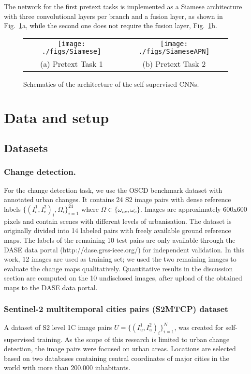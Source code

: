 \documentclass[runningheads]{llncs}
\begin{document}
{The network for the first pretext tasks is implemented as a Siamese architecture with three convolutional layers per branch and a fusion layer, as shown in Fig.~\ref{fig:siamese}a, while the second one does not require the fusion layer, Fig.~\ref{fig:siamese}b.}

\begin{figure}
    \centering
\begin{tabular}{cc}
    \texttt{[image: ./figs/Siamese]} &
    \texttt{[image: ./figs/SiameseAPN]} \\
    (a) Pretext Task 1 & (b) Pretext Task 2 \\
    \end{tabular}
    \caption{Schematics of the architecture of the self-supervised CNNs.}
    
    \label{fig:siamese}
\end{figure}

\section{Data and setup}


\subsection{Datasets}
\subsubsection{Change detection.}\label{sec:datal} For the change detection task, we use the OSCD benchmark dataset \cite{Daudt:2018:OSCD_CD_dataset} with annotated urban changes. It contains 24 S2 image pairs with dense reference labels $\{(I_c^1, I_c^2)_i, \Omega_i\}_{i=1}^{24}$ where $\Omega \in \{\omega_{nc}, \omega_c\}$. Images are approximately 600x600 pixels and contain scenes with different levels of urbanisation. The dataset is originally divided into 14 labeled pairs with freely available ground reference maps. The labels of the remaining  10 test pairs are only available through the DASE data portal (http://dase.grss-ieee.org/) for independent validation. In this work, 12 images are used as training set; we used the two remaining images to evaluate the change maps qualitatively. Quantitative results in the discussion section are computed on the 10 undisclosed images, after upload of the obtained maps to the DASE data portal. 

\subsubsection{Sentinel-2 multitemporal cities pairs (S2MTCP) dataset} 
A dataset of  S2 level 1C image pairs $U =\{(I_u^1, I_u^2)_i\}_{i=1}^{N}$, was created for self-supervised training. As the scope of this research is limited to urban change detection, the image pairs were focused on urban areas. Locations are selected based on two databases containing central coordinates of major cities in the world \cite{dataset_simplemaps,dataset_geonames} {with more} than 200.000 inhabitants. 
\end{document}
